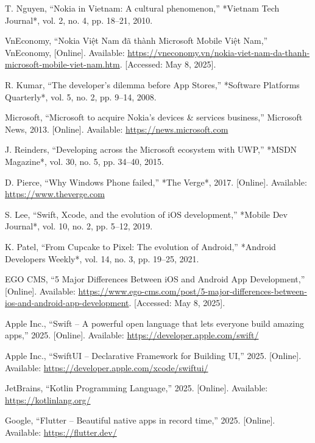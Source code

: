 \documentclass[12pt]{report}
\begin{document}
\begin{thebibliography}{1}
  T. Nguyen, ``Nokia in Vietnam: A cultural phenomenon,'' *Vietnam Tech Journal*, vol. 2, no. 4, pp. 18–21, 2010.

  VnEconomy, “Nokia Việt Nam đã thành Microsoft Mobile Việt Nam,” VnEconomy, [Online]. Available: \url{https://vneconomy.vn/nokia-viet-nam-da-thanh-microsoft-mobile-viet-nam.htm}. [Accessed: May 8, 2025].


  R. Kumar, ``The developer’s dilemma before App Stores,'' *Software Platforms Quarterly*, vol. 5, no. 2, pp. 9–14, 2008.

  Microsoft, ``Microsoft to acquire Nokia’s devices \& services business,'' Microsoft News, 2013. [Online]. Available: \url{https://news.microsoft.com}

  J. Reinders, ``Developing across the Microsoft ecosystem with UWP,'' *MSDN Magazine*, vol. 30, no. 5, pp. 34–40, 2015.

  D. Pierce, ``Why Windows Phone failed,'' *The Verge*, 2017. [Online]. Available: \url{https://www.theverge.com}

  S. Lee, ``Swift, Xcode, and the evolution of iOS development,'' *Mobile Dev Journal*, vol. 10, no. 2, pp. 5–12, 2019.

  K. Patel, ``From Cupcake to Pixel: The evolution of Android,'' *Android Developers Weekly*, vol. 14, no. 3, pp. 19–25, 2021.

  EGO CMS, “5 Major Differences Between iOS and Android App Development,” [Online]. Available: \url{https://www.ego-cms.com/post/5-major-differences-between-ios-and-android-app-development}. [Accessed: May 8, 2025].



  Apple Inc., ``Swift – A powerful open language that lets everyone build amazing apps,'' 2025. [Online]. Available: \url{https://developer.apple.com/swift/}

  Apple Inc., ``SwiftUI – Declarative Framework for Building UI,'' 2025. [Online]. Available: \url{https://developer.apple.com/xcode/swiftui/}

  JetBrains, ``Kotlin Programming Language,'' 2025. [Online]. Available: \url{https://kotlinlang.org/}

  Google, ``Flutter – Beautiful native apps in record time,'' 2025. [Online]. Available: \url{https://flutter.dev/}


\end{thebibliography}
\end{document}
